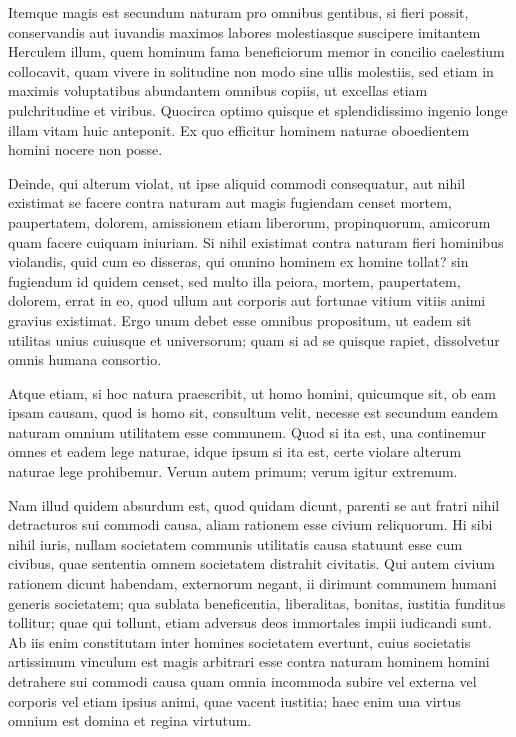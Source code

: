  Itemque magis est secundum naturam pro omnibus gentibus, si fieri possit, conservandis aut iuvandis maximos labores molestiasque suscipere imitantem Herculem illum, quem hominum fama beneficiorum memor in concilio caelestium collocavit, quam vivere in solitudine non modo sine ullis molestiis, sed etiam in maximis voluptatibus abundantem omnibus copiis, ut excellas etiam pulchritudine et viribus. Quocirca optimo quisque et splendidissimo ingenio longe illam vitam huic anteponit. Ex quo efficitur hominem naturae oboedientem homini nocere non posse.

 Deinde, qui alterum violat, ut ipse aliquid commodi consequatur, aut nihil existimat se facere contra naturam aut magis fugiendam censet mortem, paupertatem, dolorem, amissionem etiam liberorum, propinquorum, amicorum quam facere cuiquam iniuriam. Si nihil existimat contra naturam fieri hominibus violandis, quid cum eo disseras, qui omnino hominem ex homine tollat? sin fugiendum id quidem censet, sed multo illa peiora, mortem, paupertatem, dolorem, errat in eo, quod ullum aut corporis aut fortunae vitium vitiis animi gravius existimat. Ergo unum debet esse omnibus propositum, ut eadem sit utilitas unius cuiusque et universorum; quam si ad se quisque rapiet, dissolvetur omnis humana consortio.

 Atque etiam, si hoc natura praescribit, ut homo homini, quicumque sit, ob eam ipsam causam, quod is homo sit, consultum velit, necesse est secundum eandem naturam omnium utilitatem esse communem. Quod si ita est, una continemur omnes et eadem lege naturae, idque ipsum si ita est, certe violare alterum naturae lege prohibemur. Verum autem primum; verum igitur extremum.

 Nam illud quidem absurdum est, quod quidam dicunt, parenti se aut fratri nihil detracturos sui commodi causa, aliam rationem esse civium reliquorum. Hi sibi nihil iuris, nullam societatem communis utilitatis causa statuunt esse cum civibus, quae sententia omnem societatem distrahit civitatis. Qui autem civium rationem dicunt habendam, externorum negant, ii dirimunt communem humani generis societatem; qua sublata beneficentia, liberalitas, bonitas, iustitia funditus tollitur; quae qui tollunt, etiam adversus deos immortales impii iudicandi sunt. Ab iis enim constitutam inter homines societatem evertunt, cuius societatis artissimum vinculum est magis arbitrari esse contra naturam hominem homini detrahere sui commodi causa quam omnia incommoda subire vel externa vel corporis vel etiam ipsius animi, quae vacent iustitia; haec enim una virtus omnium est domina et regina virtutum.

